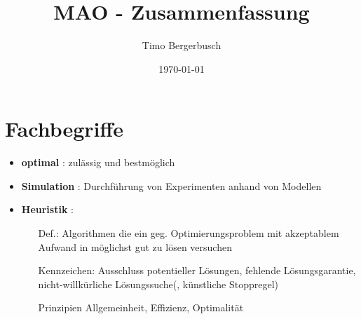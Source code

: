 \documentclass[12pt]{article}
\begin{document}
	
	\title{MAO - Zusammenfassung}
	\author{Timo Bergerbusch}
	\date{\specialdate\today}
	\maketitle
	
	\tableofcontents
	\newpage
	
	\section{Fachbegriffe}
		\begin{itemize}
			\item \textbf{optimal} \label{optimal}\label{Optimum}: zulässig und bestmöglich
			\item \textbf{Simulation} \label{Simulation}: Durchführung von Experimenten anhand von Modellen
			\item \textbf{Heuristik} \label{Heuristik}: 
				\begin{itemize}
					\item[Def.:] Algorithmen die ein geg. Optimierungsproblem mit akzeptablem Aufwand in möglichst gut zu lösen versuchen
					\item[Kennzeichen:] Ausschluss potentieller Lösungen, fehlende Lösungsgarantie, nicht-willkürliche Lösungssuche(, künstliche Stoppregel)
					\item[Prinzipien] Allgemeinheit, Effizienz, Optimalität	\\
\end{itemize}
\end{itemize}
\end{document}
